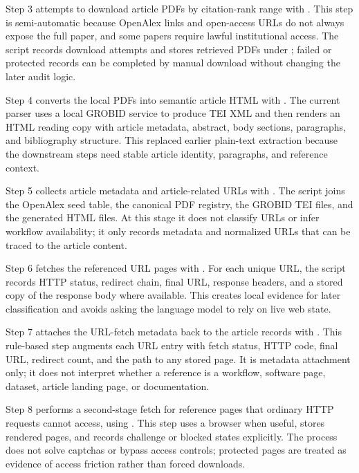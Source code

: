\documentclass[runningheads]{llncs}
\begin{document}
Step 3 attempts to download article PDFs by citation-rank range with
. This step is
semi-automatic because OpenAlex links and open-access URLs do not always expose
the full paper, and some papers require lawful institutional access. The script
records download attempts and stores retrieved PDFs under
; failed or protected records can be completed by
manual download without changing the later audit logic.

Step 4 converts the local PDFs into semantic article HTML with
. The current parser uses a local
GROBID service to produce TEI XML and then renders an HTML reading copy with
article metadata, abstract, body sections, paragraphs, and bibliography
structure. This replaced earlier plain-text extraction because the downstream
steps need stable article identity, paragraphs, and reference context.

Step 5 collects article metadata and article-related URLs with
. The script joins the OpenAlex seed
table, the canonical PDF registry, the GROBID TEI files, and the generated HTML
files. At this stage it does not classify URLs or infer workflow availability;
it only records metadata and normalized URLs that can be traced to the article
content.

Step 6 fetches the referenced URL pages with
. For each unique URL, the script
records HTTP status, redirect chain, final URL, response headers, and a stored
copy of the response body where available. This creates local evidence for
later classification and avoids asking the language model to rely on live web
state.

Step 7 attaches the URL-fetch metadata back to the article records with
. This rule-based step augments
each URL entry with fetch status, HTTP code, final URL, redirect count, and the
path to any stored page. It is metadata attachment only; it does not interpret
whether a reference is a workflow, software page, dataset, article landing
page, or documentation.

Step 8 performs a second-stage fetch for reference pages that ordinary HTTP
requests cannot access, using . This
step uses a browser when useful, stores rendered pages, and records challenge
or blocked states explicitly. The process
does not solve captchas or bypass access controls; protected pages are treated
as evidence of access friction rather than forced downloads.
\end{document}
